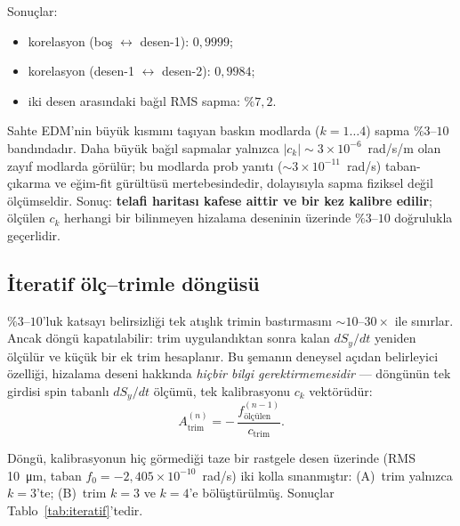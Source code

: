 \documentclass[preprint,12pt]{elsarticle}
\begin{document}
Sonuçlar:
\begin{itemize}
  \item korelasyon (boş $\leftrightarrow$ desen-1): $0{,}9999$;
  \item korelasyon (desen-1 $\leftrightarrow$ desen-2): $0{,}9984$;
  \item iki desen arasındaki bağıl RMS sapma: $\%7{,}2$.
\end{itemize}

Sahte EDM'nin büyük kısmını taşıyan baskın modlarda ($k=1\ldots4$) sapma
$\%3$--$10$ bandındadır. Daha büyük bağıl sapmalar yalnızca
$|c_k|\sim3\times10^{-6}$~rad/s/m olan zayıf modlarda görülür; bu modlarda
prob yanıtı ($\sim3\times10^{-11}$~rad/s) taban-çıkarma ve eğim-fit
gürültüsü mertebesindedir, dolayısıyla sapma fiziksel değil ölçümseldir.
Sonuç: \textbf{telafi haritası kafese aittir ve bir kez kalibre edilir};
ölçülen $c_k$ herhangi bir bilinmeyen hizalama deseninin üzerinde
$\%3$--$10$ doğrulukla geçerlidir.

\subsection{İteratif ölç--trimle döngüsü}
\label{sec:trim-iteratif}

$\%3$--$10$'luk katsayı belirsizliği tek atışlık trimin bastırmasını
$\sim10$--$30\times$ ile sınırlar. Ancak döngü kapatılabilir: trim
uygulandıktan sonra kalan $dS_y/dt$ yeniden ölçülür ve küçük bir ek trim
hesaplanır. Bu şemanın deneysel açıdan belirleyici özelliği, hizalama
deseni hakkında \emph{hiçbir bilgi gerektirmemesidir} — döngünün tek
girdisi spin tabanlı $dS_y/dt$ ölçümü, tek kalibrasyonu $c_k$ vektörüdür:
\begin{equation}
  A^{(n)}_\mathrm{trim} = -\,\frac{f^{(n-1)}_\mathrm{ölçülen}}{c_\mathrm{trim}} .
  \label{eq:trim-dongu}
\end{equation}

Döngü, kalibrasyonun hiç görmediği taze bir rastgele desen üzerinde
(RMS \SI{10}{\micro\meter}, taban $f_0=-2{,}405\times10^{-10}$~rad/s)
iki kolla sınanmıştır: (A)~trim yalnızca $k=3$'te; (B)~trim $k=3$ ve
$k=4$'e bölüştürülmüş. Sonuçlar Tablo~\ref{tab:iteratif}'tedir.
\end{document}
